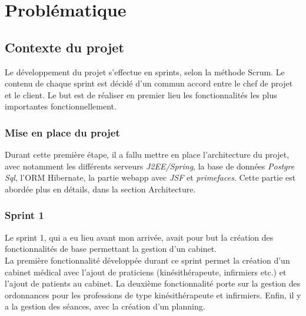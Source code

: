 \newpage
\section{Problématique} %

\subsection{Contexte du projet}
Le développement du projet s'effectue en sprints, selon la méthode Scrum. Le contenu de chaque sprint est décidé d'un commun accord entre le chef de projet et le client. Le but est de réaliser en premier lieu les fonctionnalités les plus importantes fonctionnellement. 

\subsubsection{Mise en place du projet}
Durant cette première étape, il a fallu mettre en place l'architecture du projet, avec notamment les différents serveurs \textit{J2EE/Spring}, la base de données \textit{Postgre Sql}, l'\gls{ORM} Hibernate, la partie webapp avec \textit{JSF} et \textit{primefaces}.
Cette partie est abordée plus en détails, dans la section Architecture.

\subsubsection{Sprint 1}
Le sprint 1, qui a eu lieu avant mon arrivée, avait pour but la création des fonctionnalités de base permettant la gestion d'un cabinet.\\

La première fonctionnalité développée durant ce sprint permet la création d'un cabinet médical avec l'ajout de praticiens (kinésithérapeute, infirmiers etc.) et l'ajout de patients au cabinet.
La deuxième fonctionnalité porte sur la gestion des ordonnances pour les professions de type kinésithérapeute et infirmiers. Enfin, il y a la gestion des séances, avec la création d'un planning.


